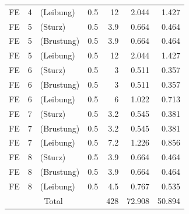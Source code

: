 \documentclass[a4paper, oneside]{discothesis}
\begin{document}
\begin{table}[H]
\begin{tabular}{ccccrrr}
    \multicolumn{1}{l}{FE} & \multicolumn{1}{r}{4} & \multicolumn{1}{l}{(Leibung)} & \multicolumn{1}{r}{0.5} & 12   & 2.044 & 1.427 \\
    \multicolumn{1}{l}{FE} & \multicolumn{1}{r}{5} & \multicolumn{1}{l}{(Sturz)} & \multicolumn{1}{r}{0.5} & 3.9  & 0.664 & 0.464 \\
    \multicolumn{1}{l}{FE} & \multicolumn{1}{r}{5} & \multicolumn{1}{l}{(Brustung)} & \multicolumn{1}{r}{0.5} & 3.9  & 0.664 & 0.464 \\
    \multicolumn{1}{l}{FE} & \multicolumn{1}{r}{5} & \multicolumn{1}{l}{(Leibung)} & \multicolumn{1}{r}{0.5} & 12   & 2.044 & 1.427 \\
    \multicolumn{1}{l}{FE} & \multicolumn{1}{r}{6} & \multicolumn{1}{l}{(Sturz)} & \multicolumn{1}{r}{0.5} & 3    & 0.511 & 0.357 \\
    \multicolumn{1}{l}{FE} & \multicolumn{1}{r}{6} & \multicolumn{1}{l}{(Brustung)} & \multicolumn{1}{r}{0.5} & 3    & 0.511 & 0.357 \\
    \multicolumn{1}{l}{FE} & \multicolumn{1}{r}{6} & \multicolumn{1}{l}{(Leibung)} & \multicolumn{1}{r}{0.5} & 6    & 1.022 & 0.713 \\
    \multicolumn{1}{l}{FE} & \multicolumn{1}{r}{7} & \multicolumn{1}{l}{(Sturz)} & \multicolumn{1}{r}{0.5} & 3.2  & 0.545 & 0.381 \\
    \multicolumn{1}{l}{FE} & \multicolumn{1}{r}{7} & \multicolumn{1}{l}{(Brustung)} & \multicolumn{1}{r}{0.5} & 3.2  & 0.545 & 0.381 \\
    \multicolumn{1}{l}{FE} & \multicolumn{1}{r}{7} & \multicolumn{1}{l}{(Leibung)} & \multicolumn{1}{r}{0.5} & 7.2  & 1.226 & 0.856 \\
    \multicolumn{1}{l}{FE} & \multicolumn{1}{r}{8} & \multicolumn{1}{l}{(Sturz)} & \multicolumn{1}{r}{0.5} & 3.9  & 0.664 & 0.464 \\
    \multicolumn{1}{l}{FE} & \multicolumn{1}{r}{8} & \multicolumn{1}{l}{(Brustung)} & \multicolumn{1}{r}{0.5} & 3.9  & 0.664 & 0.464 \\
    \multicolumn{1}{l}{FE} & \multicolumn{1}{r}{8} & \multicolumn{1}{l}{(Leibung)} & \multicolumn{1}{r}{0.5} & 4.5  & 0.767 & 0.535 \\
    \hline
    \multicolumn{4}{c}{Total} & 428  & 72.908 & 50.894 \\
    \bottomrule
    \end{tabular}%
  \label{tab:SumatraThermalBridgeLoss}%
\end{table}%
\end{document}
